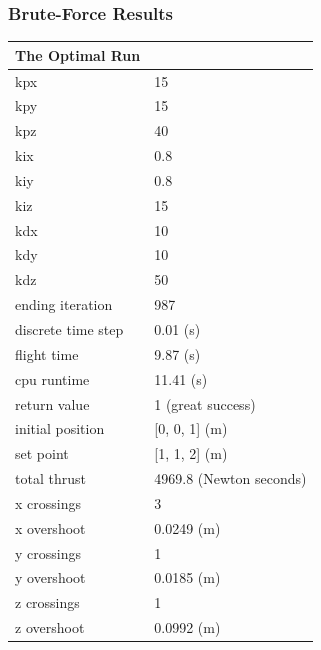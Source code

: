 \documentclass{beamer}
\begin{document}
\begin{frame}

\frametitle{Brute-Force Results}
{\scriptsize
\begin{table}\label{table:optimalrun}

\centering
\begin{tabular}{l l}
The Optimal Run      \\
\hline
kpx                 & 15 \\
kpy                 & 15 \\
kpz                 & 40 \\
kix                 & 0.8 \\
kiy                 & 0.8 \\
kiz                 & 15 \\
kdx                 & 10 \\
kdy                 & 10 \\
kdz                 & 50 \\
ending iteration    & 987 \\
discrete time step   & 0.01 (s)\\
flight time         & 9.87 (s) \\
cpu runtime         & 11.41 (s)\\
return value        & 1 (great success)\\
initial position    & [0, 0, 1] (m)\\
set point           & [1, 1, 2] (m) \\
total thrust        & 4969.8 (Newton seconds) \\
x crossings         & 3 \\
x overshoot         & 0.0249 (m) \\
y crossings         & 1 \\
y overshoot         & 0.0185 (m)\\
z crossings         & 1 \\
z overshoot         & 0.0992 (m) \\
\end{tabular}

\end{table}
}

\end{frame}
\end{document}
